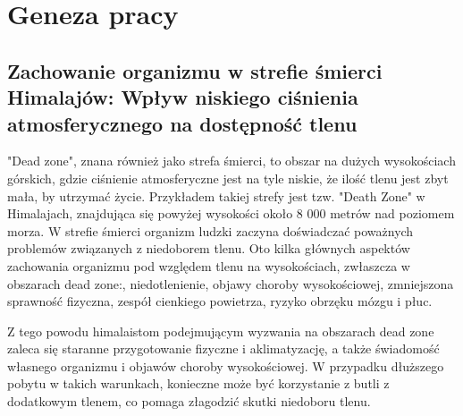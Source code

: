 \chapter{Geneza pracy}
\section{Zachowanie organizmu w strefie śmierci Himalajów: Wpływ niskiego ciśnienia atmosferycznego na dostępność tlenu}
"Dead zone", znana również jako strefa śmierci, to obszar na dużych wysokościach górskich, gdzie ciśnienie atmosferyczne jest na tyle niskie, że ilość tlenu jest zbyt mała, by utrzymać życie. Przykładem takiej strefy jest tzw. "Death Zone" w Himalajach, znajdująca się powyżej wysokości około 8 000 metrów nad poziomem morza. W strefie śmierci organizm ludzki zaczyna doświadczać poważnych problemów związanych z niedoborem tlenu. Oto kilka głównych aspektów zachowania organizmu pod względem tlenu na wysokościach, zwłaszcza w obszarach dead zone:, niedotlenienie, objawy choroby wysokościowej, zmniejszona sprawność fizyczna, zespół cienkiego powietrza, ryzyko obrzęku mózgu i płuc. \cite{deathzone}

Z tego powodu himalaistom podejmującym wyzwania na obszarach dead zone zaleca się staranne przygotowanie fizyczne i aklimatyzację, a także świadomość własnego organizmu i objawów choroby wysokościowej. W przypadku dłuższego pobytu w takich warunkach, konieczne może być korzystanie z butli z dodatkowym tlenem, co pomaga złagodzić skutki niedoboru tlenu.

